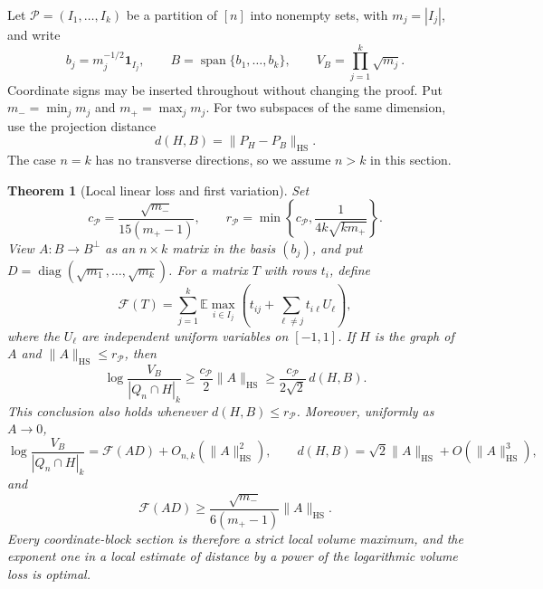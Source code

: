 \documentclass[11pt,a4paper]{article}
\newtheorem{theorem}{Theorem}[section]
\theoremstyle{remark}\newtheorem{remark}[theorem]{Remark}
\numberwithin{equation}{section}
\begin{document}
Let $\mathcal P=(I_1,\ldots,I_k)$ be a partition of $[n]$ into nonempty
sets, with $m_j=|I_j|$, and write
\[
 b_j=m_j^{-1/2}\mathbf 1_{I_j},\qquad
 B=\operatorname{span}\{b_1,\ldots,b_k\},\qquad
 V_B=\prod_{j=1}^k\sqrt{m_j}.
\]
Coordinate signs may be inserted throughout without changing the proof.
Put $m_-=\min_jm_j$ and $m_+=\max_jm_j$. For two subspaces of the same
dimension, use the projection distance
\[
 d(H,B)=\|P_H-P_B\|_{\mathrm{HS}}.
\]
The case $n=k$ has no transverse directions, so we assume $n>k$ in this
section.

\begin{theorem}[Local linear loss and first variation]
\label{thm:local-linear}\label{prop:first-variation}
Set
\[
 c_{\mathcal P}=\frac{\sqrt{m_-}}{15(m_+-1)},\qquad
 r_{\mathcal P}=\min\left\{c_{\mathcal P},
                         \frac1{4k\sqrt{k m_+}}\right\}.
\]
View \(A:B\to B^\perp\) as an \(n\times k\) matrix in the basis
\((b_j)\), and put \(D=\operatorname{diag}(\sqrt{m_1},\ldots,\sqrt{m_k})\).
For a matrix \(T\) with rows \(t_i\), define
\[
 \mathcal F(T)=\sum_{j=1}^k\mathbb E\max_{i\in I_j}
       \left(t_{ij}+\sum_{\ell\ne j}t_{i\ell}U_\ell\right),
\]
where the \(U_\ell\) are independent uniform variables on \([-1,1]\).
If \(H\) is the graph of \(A\) and \(\|A\|_{\mathrm{HS}}\le r_{\mathcal P}\),
then
\[
 \log\frac{V_B}{|Q_n\cap H|_k}
 \ge\frac{c_{\mathcal P}}2\|A\|_{\mathrm{HS}}
 \ge\frac{c_{\mathcal P}}{2\sqrt2}\,d(H,B).
\]
This conclusion also holds whenever \(d(H,B)\le r_{\mathcal P}\).
Moreover, uniformly as \(A\to0\),
\begin{equation}\label{eq:local-uniform-expansion}
 \log\frac{V_B}{|Q_n\cap H|_k}
   =\mathcal F(AD)+O_{n,k}(\|A\|_{\mathrm{HS}}^2),\qquad
 d(H,B)=\sqrt2\|A\|_{\mathrm{HS}}+O(\|A\|_{\mathrm{HS}}^3),
\end{equation}
and
\[
 \mathcal F(AD)\ge
 \frac{\sqrt{m_-}}{6(m_+-1)}\|A\|_{\mathrm{HS}}.
\]
Every coordinate-block section is therefore a strict local volume
maximum, and the exponent one in a local estimate of distance by a
power of the logarithmic volume loss is optimal.
\end{theorem}
\end{document}

